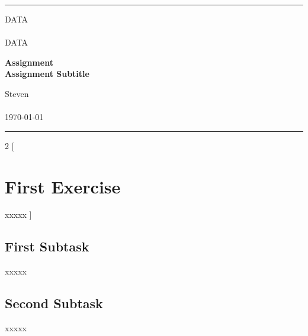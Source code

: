 \documentclass[a4paper, 11pt]{article} %
\begin{document}

\fancyhead[C]{}
\hrule \medskip %
\begin{minipage}{0.295\textwidth} %
    \raggedright
    DATA\\ %
    \footnotesize %
    \hfill\\
    DATA\\ %
\end{minipage}
\begin{minipage}{0.4\textwidth} %
    \centering
    \large %
    \textbf{Assignment}\\ %
    \normalsize %
    \textbf{Assignment Subtitle}\\ %
\end{minipage}
\begin{minipage}{0.295\textwidth} %
    \raggedleft
    Steven\\ %
    \footnotesize %
    \hfill\\
    \today\\ %
\end{minipage}
\medskip\hrule %
\bigskip


\begin{multicols}{2}
    [
        \section{\textbf{First Exercise}}
        xxxxx
    ]

    \subsection{\textbf{First Subtask}}
    xxxxx

    \subsection{\textbf{Second Subtask}}
    xxxxx


\end{multicols}
\end{document}
